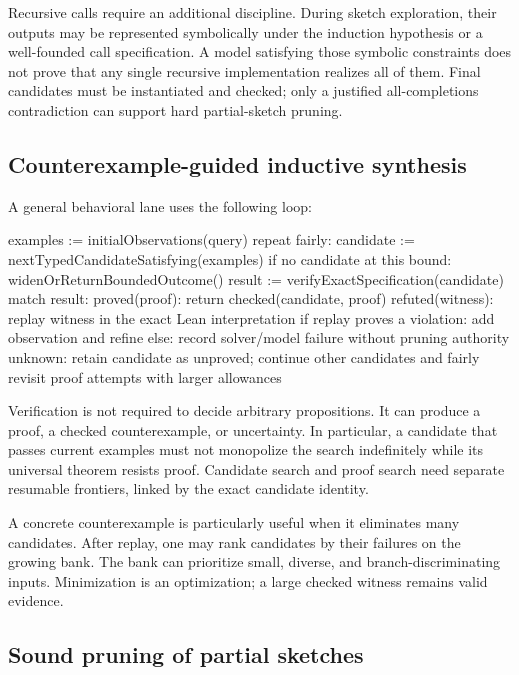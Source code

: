 \documentclass[11pt,letterpaper]{article}
\theoremstyle{definition}
\theoremstyle{remark}
\begin{document}
Recursive calls require an additional discipline. During sketch exploration, their outputs may be represented symbolically under the induction hypothesis or a well-founded call specification. A model satisfying those symbolic constraints does not prove that any single recursive implementation realizes all of them. Final candidates must be instantiated and checked; only a justified all-completions contradiction can support hard partial-sketch pruning.

\subsection{Counterexample-guided inductive synthesis}

A general behavioral lane uses the following loop:
\begin{code}
examples := initialObservations(query)
repeat fairly:
    candidate := nextTypedCandidateSatisfying(examples)
    if no candidate at this bound: widenOrReturnBoundedOutcome()
    result := verifyExactSpecification(candidate)
    match result:
      proved(proof): return checked(candidate, proof)
      refuted(witness):
          replay witness in the exact Lean interpretation
          if replay proves a violation: add observation and refine
          else: record solver/model failure without pruning authority
      unknown:
          retain candidate as unproved; continue other candidates
          and fairly revisit proof attempts with larger allowances
\end{code}

Verification is not required to decide arbitrary propositions. It can produce a proof, a checked counterexample, or uncertainty. In particular, a candidate that passes current examples must not monopolize the search indefinitely while its universal theorem resists proof. Candidate search and proof search need separate resumable frontiers, linked by the exact candidate identity.

A concrete counterexample is particularly useful when it eliminates many candidates. After replay, one may rank candidates by their failures on the growing bank. The bank can prioritize small, diverse, and branch-discriminating inputs. Minimization is an optimization; a large checked witness remains valid evidence.

\subsection{Sound pruning of partial sketches}
\end{document}
